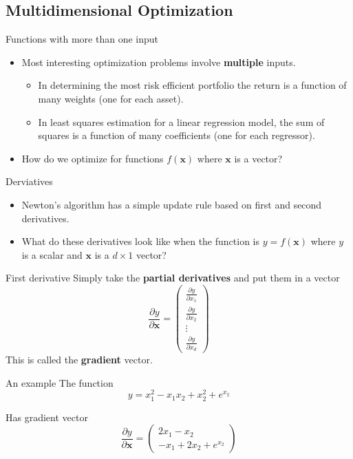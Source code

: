 \documentclass[10pt]{beamer}
\begin{document}
\subsection{Multidimensional Optimization}
\begin{frame}{Functions with more than one input}
  \begin{itemize}
  \item Most interesting optimization problems involve {\bf multiple} inputs.
    \begin{itemize}
    \item In determining the most risk efficient portfolio the return is a function of many weights (one for each asset).
    \item In least squares estimation for a linear regression model, the sum of squares is a function of many coefficients (one for each regressor).
    \end{itemize}
  \item How do we optimize for functions $f({\bm x})$ where ${\bm x}$ is a vector?
  \end{itemize}
\end{frame}
\begin{frame}{Derviatives}
  \begin{itemize}
  \item Newton's algorithm has a simple update rule based on first and second derivatives.

  \item What do these derivatives look like when the function is $y=f({\bm x})$ where $y$ is a scalar and ${\bm x}$ is a $d\times 1$ vector?
  \end{itemize}
\end{frame}
\begin{frame}{First derivative}
  Simply take the {\bf partial derivatives} and put them in a vector
  \begin{equation}
    \frac{\partial y}{\partial{\bm x}}=
    \left(
      \begin{array}{c}
        \frac{\partial y}{\partial x_1}\\
        \frac{\partial y}{\partial x_2}\\
        \vdots\\
        \frac{\partial y}{\partial x_d}
      \end{array}
    \right)
  \end{equation}
  This is called the {\bf gradient} vector.
\end{frame}
\begin{frame}{An example}
  The function
  \begin{equation}
    y=x_1^2-x_1x_2+x_2^2+e^{x_2}
  \end{equation}

  Has gradient vector
  \begin{equation}
    \frac{\partial y}{\partial{\bm x}}=
    \left(
      \begin{array}{c}
        2x_1-x_2\\
        -x_1+2x_2+e^{x_2}
      \end{array}
    \right)
  \end{equation}
\end{frame}
\end{document}
